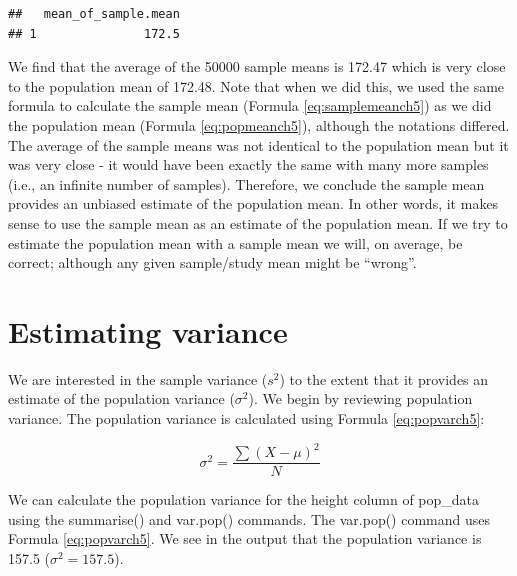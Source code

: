 \documentclass[
]{krantz}
\makeatletter
\newenvironment{Shaded}{\begin{snugshade}}{\end{snugshade}}
\newcommand{\DataTypeTok}[1]{\textcolor[rgb]{0.27,0.27,0.27}{#1}}
\newcommand{\KeywordTok}[1]{\textcolor[rgb]{0.27,0.27,0.27}{\textbf{#1}}}
\newcommand{\NormalTok}[1]{#1}
\newcommand{\OperatorTok}[1]{\textcolor[rgb]{0.43,0.43,0.43}{\textbf{#1}}}
\newcommand{\StringTok}[1]{\textcolor[rgb]{0.5,0.5,0.5}{#1}}
\newenvironment{kframe}{%
\medskip{}
\setlength{\fboxsep}{.8em}
 \def\at@end@of@kframe{}%
 \ifinner\ifhmode%
  \def\at@end@of@kframe{\end{minipage}}%
  \begin{minipage}{\columnwidth}%
 \fi\fi%
 \def\FrameCommand##1{\hskip\@totalleftmargin \hskip-\fboxsep
 \colorbox{shadecolor}{##1}\hskip-\fboxsep
     \hskip-\linewidth \hskip-\@totalleftmargin \hskip\columnwidth}%
 \MakeFramed {\advance\hsize-\width
   \@totalleftmargin\z@ \linewidth\hsize
   \@setminipage}}%
 {\par\unskip\endMakeFramed%
 \at@end@of@kframe}
\renewenvironment{Shaded}{\begin{kframe}}{\end{kframe}}
\makeatother
\begin{document}
\begin{Shaded}
\end{Shaded}

\begin{verbatim}
##   mean_of_sample.mean
## 1               172.5
\end{verbatim}

We find that the average of the 50000 sample means is 172.47 which is very close to the population mean of 172.48. Note that when we did this, we used the same formula to calculate the sample mean (Formula \eqref{eq:samplemeanch5}) as we did the population mean (Formula \eqref{eq:popmeanch5}), although the notations differed. The average of the sample means was not identical to the population mean but it was very close - it would have been exactly the same with many more samples (i.e., an infinite number of samples). Therefore, we conclude the sample mean provides an unbiased estimate of the population mean. In other words, it makes sense to use the sample mean as an estimate of the population mean. If we try to estimate the population mean with a sample mean we will, on average, be correct; although any given sample/study mean might be ``wrong''.

\hypertarget{estimating-variance}{%
\section{Estimating variance}\label{estimating-variance}}

We are interested in the sample variance (\(s^2\)) to the extent that it provides an estimate of the population variance (\(\sigma^2\)). We begin by reviewing population variance. The population variance is calculated using Formula \eqref{eq:popvarch5}:

\begin{equation} 
\sigma^2 = \frac{\sum{(X - \mu)^2}}{N}
      \label{eq:popvarch5}
\end{equation}

We can calculate the population variance for the height column of pop\_data using the summarise() and var.pop() commands. The var.pop() command uses Formula \eqref{eq:popvarch5}. We see in the output that the population variance is 157.5 (\(\sigma^2 = 157.5\)).
\end{document}

